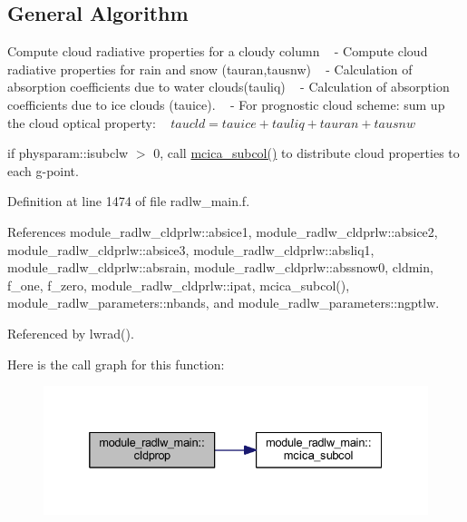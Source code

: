 \hypertarget{group__module__radsw__main_general}{}\subsection{General Algorithm}\label{group__module__radsw__main_general}

\begin{DoxyEnumerate}
\item Compute cloud radiative properties for a cloudy column ~\newline
 -\/ Compute cloud radiative properties for rain and snow (tauran,tausnw) ~\newline
 -\/ Calculation of absorption coefficients due to water clouds(tauliq) ~\newline
 -\/ Calculation of absorption coefficients due to ice clouds (tauice). ~\newline
 -\/ For prognostic cloud scheme\+: sum up the cloud optical property\+: ~\newline
 $ taucld=tauice+tauliq+tauran+tausnw $
\item if physparam\+::isubclw $>$ 0, call \hyperlink{group__module__radlw__main_ga378846d33b06ea00ba43d9c3b4c3a661}{mcica\+\_\+subcol()} to distribute cloud properties to each g-\/point. 
\end{DoxyEnumerate}

Definition at line 1474 of file radlw\+\_\+main.\+f.



References module\+\_\+radlw\+\_\+cldprlw\+::absice1, module\+\_\+radlw\+\_\+cldprlw\+::absice2, module\+\_\+radlw\+\_\+cldprlw\+::absice3, module\+\_\+radlw\+\_\+cldprlw\+::absliq1, module\+\_\+radlw\+\_\+cldprlw\+::absrain, module\+\_\+radlw\+\_\+cldprlw\+::abssnow0, cldmin, f\+\_\+one, f\+\_\+zero, module\+\_\+radlw\+\_\+cldprlw\+::ipat, mcica\+\_\+subcol(), module\+\_\+radlw\+\_\+parameters\+::nbands, and module\+\_\+radlw\+\_\+parameters\+::ngptlw.



Referenced by lwrad().



Here is the call graph for this function\+:\nopagebreak
\begin{figure}[H]
\begin{center}
\leavevmode
\includegraphics[width=332pt]{group__module__radlw__main_ga735598d1b11b0a090d142977a8f64f89_cgraph}
\end{center}
\end{figure}




